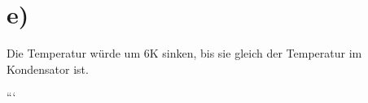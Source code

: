 

\section*{e)}
Die Temperatur würde um 6K sinken, bis sie gleich der Temperatur im Kondensator ist.

```